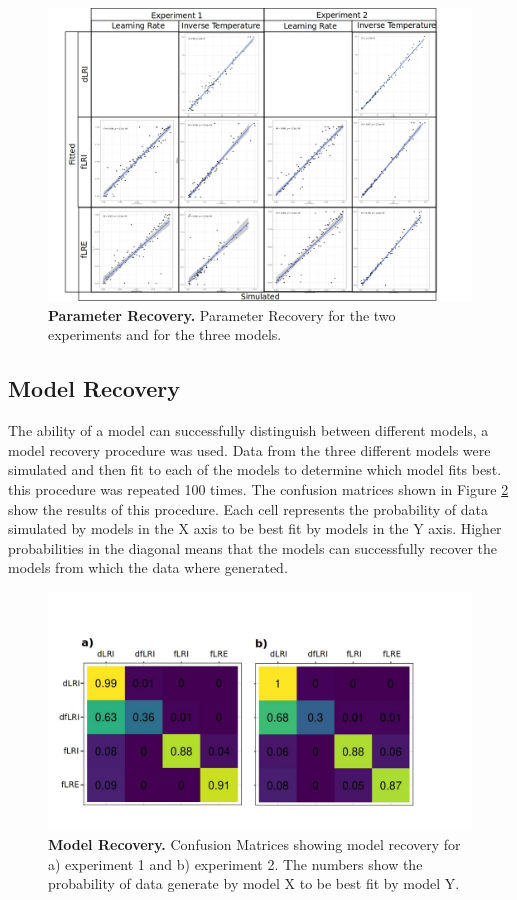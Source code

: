 \documentclass[a4paper,12pt]{article}
\begin{document}
\begin{figure}[ht!]
\centerline
{\includegraphics[width=1.5\textwidth]{figures/ParameterRecoveryAll.jpg}}
\caption{\textbf{Parameter Recovery.} Parameter Recovery for the two experiments and for the three models.}
\label{fig:parameter_recovery}
\end{figure}

\subsection*{Model Recovery}
The ability of a model can successfully distinguish between different models, a model recovery procedure was used. Data from the three different models were simulated and then fit to each of the models to determine which model fits best. this procedure was repeated 100 times. The confusion matrices shown in Figure \ref{fig:model_recovery} show the results of this procedure. Each cell represents the probability of data simulated by models in the X axis to be best fit by models in the Y axis. Higher probabilities in the diagonal means that the models can successfully recover the models from which the data where generated.  

\begin{figure}[ht!]
\centerline
{\includegraphics[width=1\textwidth]{figures/ModelRecovery.jpg}}
\caption{\textbf{Model Recovery.} Confusion Matrices showing model recovery for a) experiment 1 and b) experiment 2. The numbers show the probability of data generate by model X to be best fit by model Y.}
\label{fig:model_recovery}
\end{figure}
\end{document}
